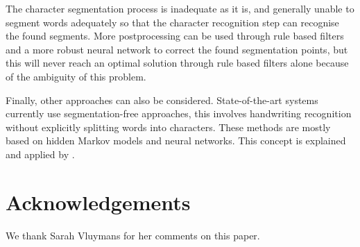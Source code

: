 \documentclass{article}
\begin{document}
The character segmentation process is inadequate as it is, and generally unable to segment words adequately so that the character recognition step can recognise the found segments.
More postprocessing can be used through rule based filters and a more robust neural network to correct the found segmentation points, but this will never reach an optimal solution through rule based filters alone because of the ambiguity of this problem.

Finally, other approaches can also be considered.
State-of-the-art systems currently use segmentation-free approaches, this involves handwriting recognition without explicitly splitting words into characters. These methods are mostly based on hidden Markov models and neural networks.
This concept is explained and applied by \cite{presham}.
\section*{Acknowledgements}
We thank Sarah Vluymans for her comments on this paper.


\end{document}
